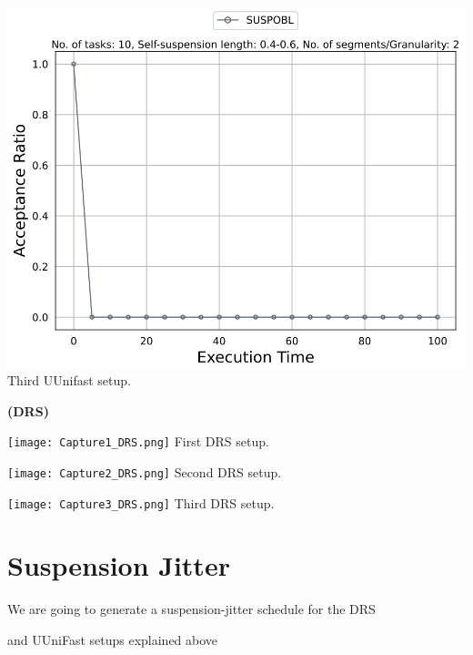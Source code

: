 \documentclass[]{article}
\begin{document}
\begin{minipage}[t]{0.48\linewidth}
		\includegraphics[width=\linewidth]{Capture3_uunifast.png}
		Third UUnifast setup.
		\vspace{0.3cm}
		
		
	\end{minipage}\hfill
	\begin{minipage}[t]{0.48\linewidth}
		\centering
		\textbf{(DRS)}
		\vspace{0.3cm}
		
		\texttt{[image: Capture1\_DRS.png]}
		First DRS setup.
		\vspace{0.3cm}
		
		\texttt{[image: Capture2\_DRS.png]}
		Second DRS setup.
		\vspace{0.3cm}
		
		\texttt{[image: Capture3\_DRS.png]}
		Third DRS setup.
		\vspace{0.3cm}
	\end{minipage}

	\clearpage
	\section{Suspension Jitter}
{
\raggedleft We are going to generate a suspension-jitter schedule for the DRS
}

{
\raggedleft and UUniFast setups explained above
}
\end{document}

